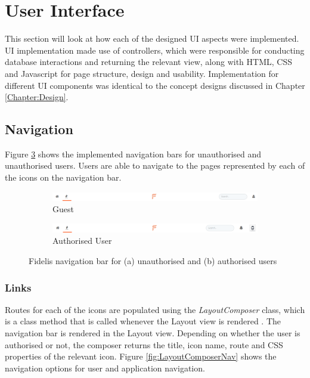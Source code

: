 \section{User Interface}
This section will look at how each of the designed UI aspects were implemented. UI implementation made use of controllers, which were responsible for conducting database interactions and returning the relevant view, along with HTML, CSS and Javascript for page structure, design and usability. Implementation for different UI components was identical to the concept designs discussed in Chapter \ref{Chapter:Design}.

\subsection{Navigation}
Figure \ref{fig:NavImplementation} shows the implemented navigation bars for unauthorised and unauthorised users. Users are able to navigate to the pages represented by each of the icons on the navigation bar. 

\begin{figure}[H]
	\centering
	\begin{subfigure}{1\linewidth}
		\includegraphics[width=1\textwidth]{Images/Design/nav-unauthorised}
		\caption{Guest}
		\label{fig:NavUnauth}
	\end{subfigure}
	\begin{subfigure}{1\linewidth}
		\includegraphics[width=1\textwidth]{Images/Design/nav-authorised}
		\caption{Authorised User}
		\label{fig:NavAuth}
	\end{subfigure}
	\caption{Fidelis navigation bar for (a) unauthorised and (b) authorised users}
	\label{fig:NavImplementation}
\end{figure}

\subsubsection{Links}
Routes for each of the icons are populated using the \textit{LayoutComposer} class, which is a class method that is called whenever the Layout view is rendered \cite{Laravel:Views}. The navigation bar is rendered in the Layout view. Depending on whether the user is authorised or not, the composer returns the title, icon name, route and CSS properties of the relevant icon. Figure \ref{fig:LayoutComposerNav} shows the navigation options for user and application navigation.

